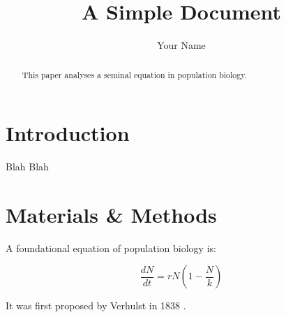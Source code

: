 \documentclass[12pt]{article}
\title{A Simple Document}
\author{Your Name}
\date{}
\begin{document}
    \maketitle

    \begin{abstract}
        This paper analyses a seminal equation in population biology.
    \end{abstract}

    \section{Introduction}
        Blah Blah

    \section{Materials \& Methods}

    A foundational equation of population biology is:

    \begin{equation}
        \frac{dN}{dt} = r N (1 - \frac{N}{k})
    \end{equation}

    It was first proposed by Verhulst in 1838 \cite{verhulst1838notice}.

    

    
\end{document}

